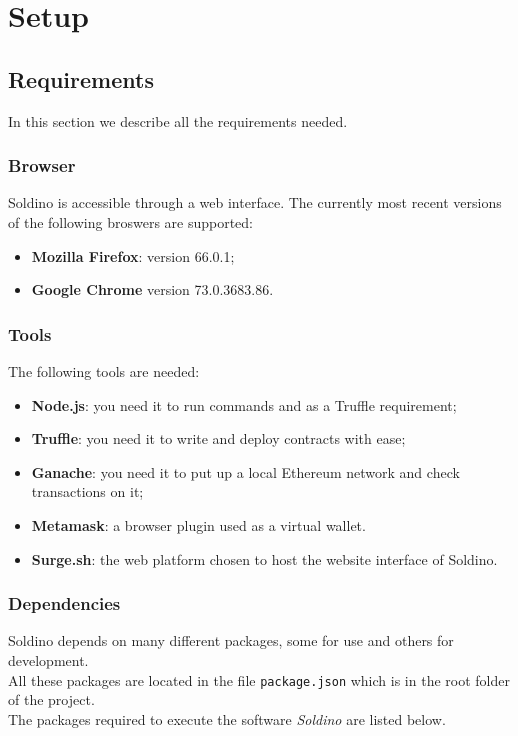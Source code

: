 \section{Setup} 
\subsection{Requirements}
In this section we describe all the requirements needed.
\subsubsection{Browser}
Soldino is accessible through a web interface. The currently most recent versions of the following broswers are supported:
\begin{itemize}
	\item \textbf{Mozilla Firefox}: version 66.0.1;
	\item \textbf{Google Chrome} version 73.0.3683.86.
\end{itemize}

\subsubsection{Tools}
The following tools are needed:
\begin{itemize}
	\item \textbf{Node.js}: you need it to run commands and as a Truffle requirement;
	\item \textbf{Truffle}: you need it to write and deploy contracts with ease;
	\item \textbf{Ganache}: you need it to put up a local Ethereum network and check transactions on it;
	\item \textbf{Metamask}: a browser plugin used as a virtual wallet.
	\item \textbf{Surge.sh}: the web platform chosen to host the website interface of Soldino.
\end{itemize}

\subsubsection{Dependencies}
Soldino depends on many different packages, some for use and others for development.\\
All these packages are located in the file \texttt{package.json} which is in the root folder of the project.\\
The packages required to execute the software \textit{Soldino} are listed below.\\

